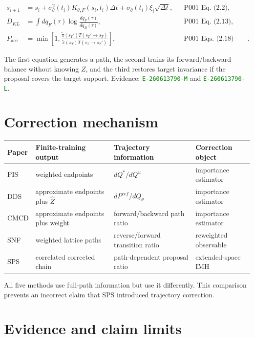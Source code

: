\documentclass[10pt]{article}
\newcommand{\eid}[1]{\textcolor{green}{\texttt{#1}}}
\begin{document}
\begin{align}
s_{i+1}
 &=s_i+\sigma_\theta^2(t_i)K_{\theta,F}(s_i,t_i)\Delta t
   +\sigma_\theta(t_i)\xi_i\sqrt{\Delta t},
   &&\text{P001 Eq.~(2.2)},\\
D_{KL}
 &=\int dq_F(\tau)\log\frac{dq_F(\tau)}{d\widetilde q_B(\tau)},
   &&\text{P001 Eq.~(2.13)},\\
P_{\mathrm{acc}}
 &=\min\!\left[1,
\frac{\widetilde\pi(s_T')T(s_T'\!\to s_T)}
     {\widetilde\pi(s_T)T(s_T\!\to s_T')}\right],
   &&\text{P001 Eqs.~(2.18)--(2.19)}.
\end{align}

The first equation generates a path, the second trains its forward/backward
balance without knowing $Z$, and the third restores target invariance if the
proposal covers the target support. Evidence: \eid{E-260613790-M} and
\eid{E-260613790-L}.

\section{Correction mechanism}

\begin{tabularx}{\linewidth}{@{}P{1.2cm}P{3.0cm}Y P{3.25cm}@{}}
\toprule
Paper & Finite-training output & Trajectory information & Correction object \\
\midrule
PIS & weighted endpoints & $dQ^*/dQ^u$ & importance estimator \\
DDS & approximate endpoints plus $\widehat Z$ & $dP^{ref}/dQ_\theta$ & importance estimator \\
CMCD & approximate endpoints plus weight & forward/backward path ratio & importance estimator \\
SNF & weighted lattice paths & reverse/forward transition ratio & reweighted observable \\
SPS & correlated corrected chain & path-dependent proposal ratio & extended-space IMH \\
\bottomrule
\end{tabularx}

All five methods use full-path information but use it differently. This
comparison prevents an incorrect claim that SPS introduced trajectory
correction.

\section{Evidence and claim limits}
\end{document}
